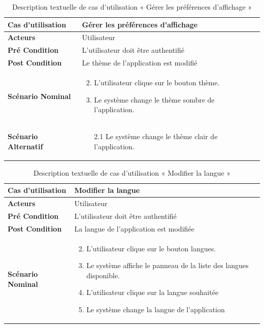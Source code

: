 \begin{longtable}{|p{5cm}|p{10cm}|}
  \caption{Description textuelle de cas d'utilisation « Gérer les préférences d'affichage  »} \label{tab:use_case_manage_display_preferences} \\
\hline
\textbf{Cas d'utilisation}&Gérer les préférences d'affichage \\
\hline
\textbf{Acteurs}&Utilisateur\\
\hline
\textbf{Pré Condition}&L'utilisateur doit être authentifié\\
\hline
\textbf{Post Condition}&Le thème de l'application est modifié \\
\hline
\textbf{Scénario Nominal}&
\vspace{-\baselineskip}
\begin{enumerate}
  \setcounter{enumi}{1}
 \item L'utilisateur clique sur le bouton thème.
 \item Le système change le thème sombre de l'application.
\end{enumerate}\\
\hline
\textbf{Scénario Alternatif}&
\vspace{-\baselineskip}
\begin{enumerate}
 \item [2.1] Le système change le thème clair de l'application.
\end{enumerate}\\
\hline

\end{longtable}


\begin{longtable}{|p{5cm}|p{10cm}|}
  \caption{Description textuelle de cas d'utilisation « Modifier la langue  »} \label{tab:use_case_change_language} \\
\hline
\textbf{Cas d'utilisation}&Modifier la langue \\
\hline
\textbf{Acteurs}&Utilisateur\\
\hline
\textbf{Pré Condition}&L'utilisateur doit être authentifié\\
\hline
\textbf{Post Condition}&La langue de l'application est modifiée \\
\hline
\textbf{Scénario Nominal}&
\vspace{-\baselineskip}
\begin{enumerate}
  \setcounter{enumi}{1}
  \item L'utilisateur clique sur le bouton langues.
  \item Le système affiche le panneau de la liste des langues disponible.
  \item L'utilisateur clique sur la langue souhaitée 
  \item Le système change la langue de l'application
\end{enumerate}\\
\hline

\end{longtable}


